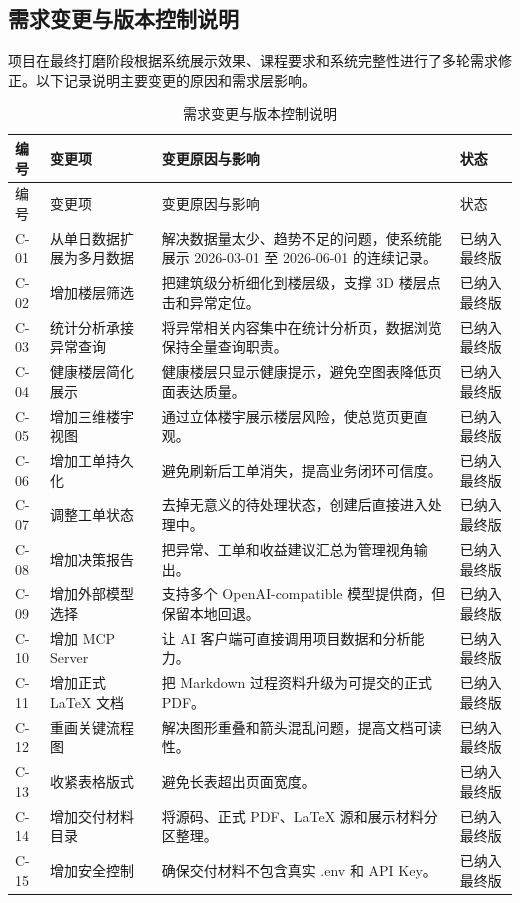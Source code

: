 \documentclass[12pt,a4paper]{ctexart}
\begin{document}
\subsection{需求变更与版本控制说明}
项目在最终打磨阶段根据系统展示效果、课程要求和系统完整性进行了多轮需求修正。以下记录说明主要变更的原因和需求层影响。
\begin{longtable}{L{1.7cm}L{4.2cm}L{6.6cm}L{3.0cm}}
\caption{需求变更与版本控制说明}\\
\toprule
编号 & 变更项 & 变更原因与影响 & 状态 \\
\midrule
\endfirsthead
\toprule
编号 & 变更项 & 变更原因与影响 & 状态 \\
\midrule
\endhead
C-01 & 从单日数据扩展为多月数据 & 解决数据量太少、趋势不足的问题，使系统能展示 2026-03-01 至 2026-06-01 的连续记录。 & 已纳入最终版 \\
C-02 & 增加楼层筛选 & 把建筑级分析细化到楼层级，支撑 3D 楼层点击和异常定位。 & 已纳入最终版 \\
C-03 & 统计分析承接异常查询 & 将异常相关内容集中在统计分析页，数据浏览保持全量查询职责。 & 已纳入最终版 \\
C-04 & 健康楼层简化展示 & 健康楼层只显示健康提示，避免空图表降低页面表达质量。 & 已纳入最终版 \\
C-05 & 增加三维楼宇视图 & 通过立体楼宇展示楼层风险，使总览页更直观。 & 已纳入最终版 \\
C-06 & 增加工单持久化 & 避免刷新后工单消失，提高业务闭环可信度。 & 已纳入最终版 \\
C-07 & 调整工单状态 & 去掉无意义的待处理状态，创建后直接进入处理中。 & 已纳入最终版 \\
C-08 & 增加决策报告 & 把异常、工单和收益建议汇总为管理视角输出。 & 已纳入最终版 \\
C-09 & 增加外部模型选择 & 支持多个 OpenAI-compatible 模型提供商，但保留本地回退。 & 已纳入最终版 \\
C-10 & 增加 MCP Server & 让 AI 客户端可直接调用项目数据和分析能力。 & 已纳入最终版 \\
C-11 & 增加正式 LaTeX 文档 & 把 Markdown 过程资料升级为可提交的正式 PDF。 & 已纳入最终版 \\
C-12 & 重画关键流程图 & 解决图形重叠和箭头混乱问题，提高文档可读性。 & 已纳入最终版 \\
C-13 & 收紧表格版式 & 避免长表超出页面宽度。 & 已纳入最终版 \\
C-14 & 增加交付材料目录 & 将源码、正式 PDF、LaTeX 源和展示材料分区整理。 & 已纳入最终版 \\
C-15 & 增加安全控制 & 确保交付材料不包含真实 .env 和 API Key。 & 已纳入最终版 \\
\bottomrule
\end{longtable}
\end{document}
